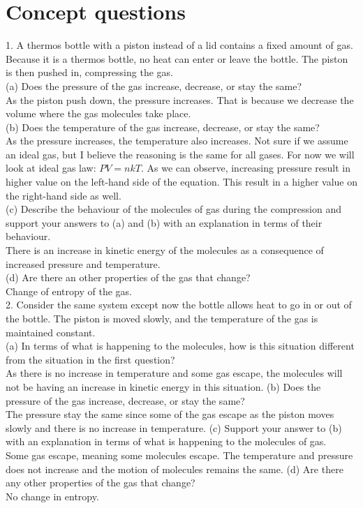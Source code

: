 \documentclass[reprint,english,notitlepage]{revtex4-2}
\begin{document}
\newpage
\appendix
\section{Concept questions}
1. A thermos bottle with a piston instead of a lid contains a fixed amount of gas. Because it is a thermos
bottle, no heat can enter or leave the bottle. The
piston is then pushed in, compressing the gas. \\
(a) Does the pressure of the gas increase, decrease,
or stay the same?\\
As the piston push down, the pressure increases. That is because we decrease the volume where the gas molecules take place.\\
(b) Does the temperature of the gas increase, decrease, or stay the same?\\
As the pressure increases, the temperature also increases. Not sure if we assume an ideal gas, but I believe the reasoning is the same for all gases. For now we will look at ideal gas law: $PV = nkT$. As we can observe, increasing pressure result in higher value on the left-hand side of the equation. This result in a higher value on the right-hand side as well.\\
(c) Describe the behaviour of the molecules of gas
during the compression and support your answers to (a) and (b) with an explanation in
terms of their behaviour. \\
There is an increase in kinetic energy of the molecules as a consequence of increased pressure and temperature.\\
(d) Are there an other properties of the gas that
change?\\
Change of entropy of the gas.\\

2. Consider the same system except now the bottle
allows heat to go in or out of the bottle. The piston
is moved slowly, and the temperature of the gas is
maintained constant.\\
(a) In terms of what is happening to the
molecules, how is this situation different from
the situation in the first question?\\
As there is no increase in temperature and some gas escape, the molecules will not be having an increase in kinetic energy in this situation.
(b) Does the pressure of the gas increase, decrease,
or stay the same?\\
The pressure stay the same since some of the gas escape as the piston moves slowly and there is no increase in temperature.
(c) Support your answer to (b) with an explanation in terms of what is happening to the
molecules of gas.\\
Some gas escape, meaning some molecules escape. The temperature and pressure does not increase and the motion of molecules remains the same.
(d) Are there any other properties of the gas that
change?\\
No change in entropy.
\end{document}

